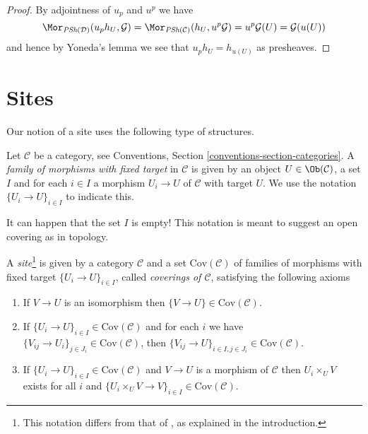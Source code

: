 \begin{proof}
By adjointness of $u_p$ and $u^p$ we have
$$
\Mor_{\textit{PSh}(\mathcal{D})}(u_ph_U, \mathcal{G})
=
\Mor_{\textit{PSh}(\mathcal{C})}(h_U, u^p\mathcal{G})
=
u^p\mathcal{G}(U) =
\mathcal{G}(u(U))
$$
and hence by Yoneda's lemma we see that $u_ph_U = h_{u(U)}$ as
presheaves.
\end{proof}

















\section{Sites}
\label{section-sites-definitions}

\noindent
Our notion of a site uses the following type of structures.

\begin{definition}
\label{definition-family-morphisms-fixed-target}
Let $\mathcal{C}$ be a category, see
Conventions, Section \ref{conventions-section-categories}.
A {\it family of morphisms with fixed target} in $\mathcal{C}$ is
given by an object $U \in \Ob(\mathcal{C})$, a set $I$ and
for each $i\in I$ a morphism $U_i \to U$ of $\mathcal{C}$ with target $U$.
We use the notation $\{U_i \to U\}_{i\in I}$ to indicate this.
\end{definition}

\noindent
It can happen that the set $I$ is empty! This
notation is meant to suggest an open covering as in topology.

\begin{definition}
\label{definition-site}
A {\it site}\footnote{This notation differs from that of \cite{SGA4}, as
explained in the introduction.} is given by a category $\mathcal{C}$ and a set
$\text{Cov}(\mathcal{C})$ of families of morphisms with fixed target
$\{U_i \to U\}_{i \in I}$, called {\it coverings of $\mathcal{C}$},
satisfying the following axioms
\begin{enumerate}
\item If $V \to U$ is an isomorphism then $\{V \to U\} \in
\text{Cov}(\mathcal{C})$.
\item If $\{U_i \to U\}_{i\in I} \in \text{Cov}(\mathcal{C})$ and for each
$i$ we have $\{V_{ij} \to U_i\}_{j\in J_i} \in \text{Cov}(\mathcal{C})$, then
$\{V_{ij} \to U\}_{i \in I, j\in J_i} \in \text{Cov}(\mathcal{C})$.
\item If $\{U_i \to U\}_{i\in I}\in \text{Cov}(\mathcal{C})$
and $V \to U$ is a morphism of $\mathcal{C}$ then $U_i \times_U V$
exists for all $i$ and
$\{U_i \times_U V \to V \}_{i\in I} \in \text{Cov}(\mathcal{C})$.
\end{enumerate}
\end{definition}


